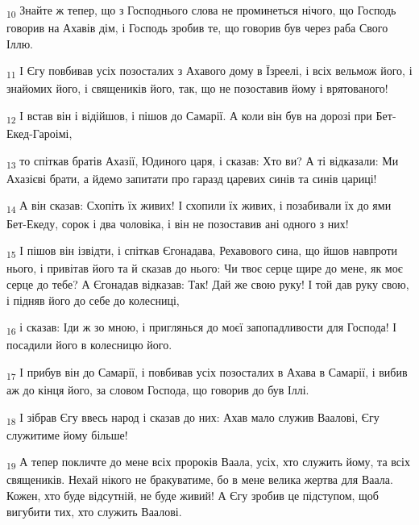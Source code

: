 \begin{tcolorbox}
\textsubscript{10} Знайте ж тепер, що з Господнього слова не проминеться нічого, що Господь говорив на Ахавів дім, і Господь зробив те, що говорив був через раба Свого Іллю.
\end{tcolorbox}
\begin{tcolorbox}
\textsubscript{11} І Єгу повбивав усіх позосталих з Ахавого дому в Їзреелі, і всіх вельмож його, і знайомих його, і священиків його, так, що не позоставив йому і врятованого!
\end{tcolorbox}
\begin{tcolorbox}
\textsubscript{12} І встав він і відійшов, і пішов до Самарії. А коли він був на дорозі при Бет-Екед-Гароімі,
\end{tcolorbox}
\begin{tcolorbox}
\textsubscript{13} то спіткав братів Ахазії, Юдиного царя, і сказав: Хто ви? А ті відказали: Ми Ахазієві брати, а йдемо запитати про гаразд царевих синів та синів цариці!
\end{tcolorbox}
\begin{tcolorbox}
\textsubscript{14} А він сказав: Схопіть їх живих! І схопили їх живих, і позабивали їх до ями Бет-Екеду, сорок і два чоловіка, і він не позоставив ані одного з них!
\end{tcolorbox}
\begin{tcolorbox}
\textsubscript{15} І пішов він ізвідти, і спіткав Єгонадава, Рехавового сина, що йшов навпроти нього, і привітав його та й сказав до нього: Чи твоє серце щире до мене, як моє серце до тебе? А Єгонадав відказав: Так! Дай же свою руку! І той дав руку свою, і підняв його до себе до колесниці,
\end{tcolorbox}
\begin{tcolorbox}
\textsubscript{16} і сказав: Іди ж зо мною, і приглянься до моєї запопадливости для Господа! І посадили його в колесницю його.
\end{tcolorbox}
\begin{tcolorbox}
\textsubscript{17} І прибув він до Самарії, і повбивав усіх позосталих в Ахава в Самарії, і вибив аж до кінця його, за словом Господа, що говорив до був Іллі.
\end{tcolorbox}
\begin{tcolorbox}
\textsubscript{18} І зібрав Єгу ввесь народ і сказав до них: Ахав мало служив Ваалові, Єгу служитиме йому більше!
\end{tcolorbox}
\begin{tcolorbox}
\textsubscript{19} А тепер покличте до мене всіх пророків Ваала, усіх, хто служить йому, та всіх священиків. Нехай нікого не бракуватиме, бо в мене велика жертва для Ваала. Кожен, хто буде відсутній, не буде живий! А Єгу зробив це підступом, щоб вигубити тих, хто служить Ваалові.
\end{tcolorbox}

